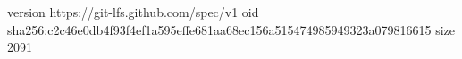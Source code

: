 version https://git-lfs.github.com/spec/v1
oid sha256:c2c46e0db4f93f4ef1a595effe681aa68ec156a515474985949323a079816615
size 2091
